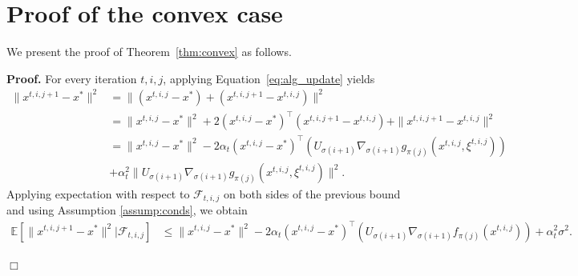 \documentclass[11pt,a4paper]{article}
\numberwithin{equation}{section}%
\newenvironment{proof}[1][Proof]{\noindent \textbf{#1.} }{\hfill$\Box$\par\medskip}
\renewcommand{\(}{\left (}
\renewcommand{\)}{\right )}
\begin{document}
\section{Proof of the convex case}\label{sec:convex}
We present the proof of Theorem~\ref{thm:convex} as follows.
\vspace{\baselineskip}

\begin{proof} For every iteration $t, i, j$, applying  Equation~\eqref{eq:alg_update} yields
\begin{align*}
    \|x^{t,i,j+1} - x^*\|^2 
    &= \|(x^{t,i,j}- x^*)  + (x^{t,i,j+1} - x^{t,i,j})\|^2 \\
    &= \|x^{t,i,j}- x^*\|^2 +2 (x^{t,i,j}- x^*)^\top(x^{t,i,j+1} - x^{t,i,j}) + \|x^{t,i,j+1} - x^{t,i,j}\|^2\\
    &= \|x^{t,i,j}- x^*\|^2 -2\alpha_t (x^{t,i,j}- x^*)^\top( U_{\sigma(i+1)} \nabla_{\sigma(i+1)} g_{\pi(j)} (x^{t,i,j}, \xi^{t,i,j})) \\
    &+ \alpha_t^2\|U_{\sigma(i+1)} \nabla_{\sigma(i+1)} g_{\pi(j)} (x^{t,i,j}, \xi^{t,i,j})\|^2.
\end{align*}
Applying expectation with respect to $\mathcal{F}_{t,i,j}$ on both sides of the previous bound  and using Assumption \ref{assump:conds}, we obtain
\begin{align*}
\mathbb{E}[\|x^{t,i,j+1} - x^*\|^2 | \mathcal{F}_{t,i,j}]
    &\leq \|x^{t,i,j}- x^*\|^2 -2\alpha_t (x^{t,i,j}- x^*)^\top( U_{\sigma(i+1)} \nabla_{\sigma(i+1)} f_{\pi(j)} (x^{t,i,j})) + \alpha_t^2 \sigma^2.
\end{align*}


\end{proof}
\end{document}
